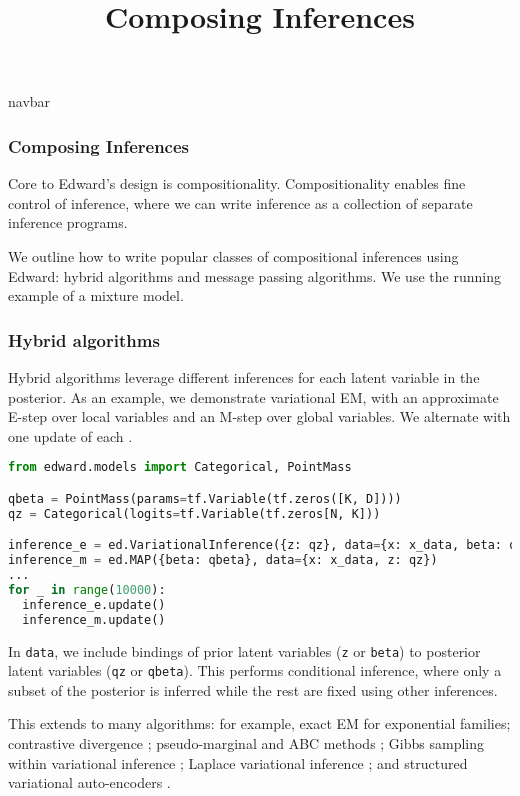 \title{Composing Inferences}

{{navbar}}

\subsubsection{Composing Inferences}

Core to Edward's design is compositionality. Compositionality enables
fine control of inference, where we can write inference as a
collection of separate inference programs.

We outline how to write popular classes of compositional inferences
using Edward: hybrid algorithms and message passing algorithms.
We use the running example of a mixture model.

\subsubsection{Hybrid algorithms}

Hybrid algorithms leverage different inferences for each latent
variable in the posterior.
As an example, we demonstrate variational EM, with an approximate
E-step over local variables and an M-step over global variables.
We alternate with one update of each \citep{neal1993new}.

\begin{lstlisting}[language=Python]
from edward.models import Categorical, PointMass

qbeta = PointMass(params=tf.Variable(tf.zeros([K, D])))
qz = Categorical(logits=tf.Variable(tf.zeros[N, K]))

inference_e = ed.VariationalInference({z: qz}, data={x: x_data, beta: qbeta})
inference_m = ed.MAP({beta: qbeta}, data={x: x_data, z: qz})
...
for _ in range(10000):
  inference_e.update()
  inference_m.update()
\end{lstlisting}

In \texttt{data}, we include bindings of prior latent variables
(\texttt{z} or \texttt{beta}) to posterior latent variables
(\texttt{qz} or \texttt{qbeta}). This performs conditional inference,
where only a subset of the posterior is inferred while the rest are
fixed using other inferences.

This extends to many algorithms: for example,
exact EM for exponential families;
contrastive divergence \citep{hinton2002training};
pseudo-marginal and ABC methods \citep{andrieu2009pseudo};
Gibbs sampling within variational inference \citep{wang2012truncation};
Laplace variational inference \citep{wang2013variational};
and
structured variational auto-encoders \citep{johnson2016composing}.

